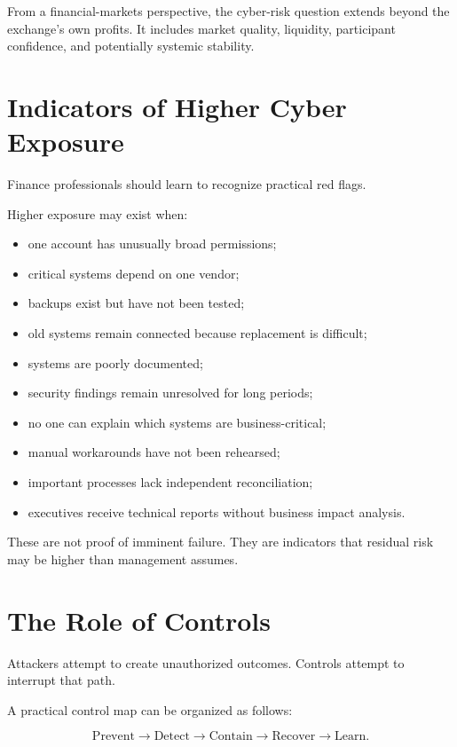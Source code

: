 From a financial-markets perspective, the cyber-risk question extends beyond the exchange's own profits. It includes market quality, liquidity, participant confidence, and potentially systemic stability.

\section{Indicators of Higher Cyber Exposure}

Finance professionals should learn to recognize practical red flags.

Higher exposure may exist when:

\begin{itemize}
    \item one account has unusually broad permissions;
    \item critical systems depend on one vendor;
    \item backups exist but have not been tested;
    \item old systems remain connected because replacement is difficult;
    \item systems are poorly documented;
    \item security findings remain unresolved for long periods;
    \item no one can explain which systems are business-critical;
    \item manual workarounds have not been rehearsed;
    \item important processes lack independent reconciliation;
    \item executives receive technical reports without business impact analysis.
\end{itemize}

These are not proof of imminent failure. They are indicators that residual risk may be higher than management assumes.

\section{The Role of Controls}

Attackers attempt to create unauthorized outcomes. Controls attempt to interrupt that path.

A practical control map can be organized as follows:

\begin{equation}
\text{Prevent}
\rightarrow
\text{Detect}
\rightarrow
\text{Contain}
\rightarrow
\text{Recover}
\rightarrow
\text{Learn}.
\end{equation}

